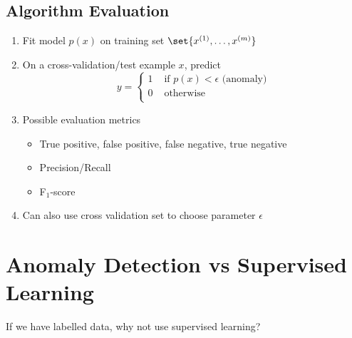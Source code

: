 \subsection{Algorithm Evaluation}
\begin{enumerate}
    \item Fit model $p(x)$ on training set $\set{x^{(1)}, \dots, x^{(m)}}$
    \item On a cross-validation/test example $x$, predict
          \begin{equation*}
              y = \begin{cases}
                  1 & \text{ if } p(x) < \epsilon \text{ (anomaly)} \\
                  0 & \text{ otherwise}                             \\
              \end{cases}
          \end{equation*}
    \item Possible evaluation metrics \begin{itemize}
              \item True positive, false positive, false negative, true negative
              \item Precision/Recall
              \item F$_1$-score
          \end{itemize}
    \item Can also use cross validation set to choose parameter $\epsilon$
\end{enumerate}

\section{Anomaly Detection vs Supervised Learning}
If we have labelled data, why not use supervised learning?

